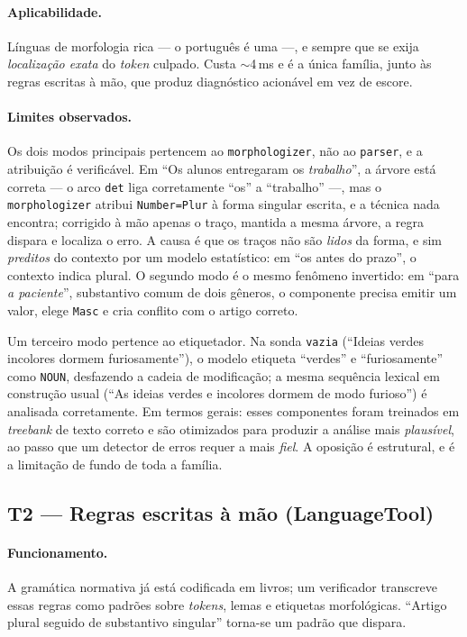 \documentclass[11pt,a4paper]{article}
\begin{document}
\paragraph{Aplicabilidade.} Línguas de morfologia rica --- o português é uma ---, e sempre que se
exija \emph{localização exata} do \textit{token} culpado. Custa $\sim$4\,ms e é a única família,
junto às regras escritas à mão, que produz diagnóstico acionável em vez de escore.

\paragraph{Limites observados.} Os dois modos principais pertencem ao \texttt{morphologizer}, não ao
\texttt{parser}, e a atribuição é verificável. Em ``Os alunos entregaram os \emph{trabalho}'', a
árvore está correta --- o arco \texttt{det} liga corretamente ``os'' a ``trabalho'' ---, mas o
\texttt{morphologizer} atribui \texttt{Number=Plur} à forma singular escrita, e a técnica nada
encontra; corrigido à mão apenas o traço, mantida a mesma árvore, a regra dispara e localiza o erro.
A causa é que os traços não são \emph{lidos} da forma, e sim \emph{preditos} do contexto por um
modelo estatístico: em ``os \underline{\hspace{1em}} antes do prazo'', o contexto indica plural. O
segundo modo é o mesmo fenômeno invertido: em ``para \emph{a paciente}'', substantivo comum de dois
gêneros, o componente precisa emitir um valor, elege \texttt{Masc} e cria conflito com o artigo
correto.

Um terceiro modo pertence ao etiquetador. Na sonda \texttt{vazia} (``Ideias verdes incolores dormem
furiosamente''), o modelo etiqueta ``verdes'' e ``furiosamente'' como \texttt{NOUN}, desfazendo a
cadeia de modificação; a mesma sequência lexical em construção usual (``As ideias verdes e
incolores dormem de modo furioso'') é analisada corretamente. Em termos gerais: esses componentes
foram treinados em \textit{treebank} de texto correto e são otimizados para produzir a análise mais
\emph{plausível}, ao passo que um detector de erros requer a mais \emph{fiel}. A oposição é
estrutural, e é a limitação de fundo de toda a família.

\subsection{T2 --- Regras escritas à mão (LanguageTool)}

\paragraph{Funcionamento.} A gramática normativa já está codificada em livros; um verificador
transcreve essas regras como padrões sobre \textit{tokens}, lemas e etiquetas morfológicas.
``Artigo plural seguido de substantivo singular'' torna-se um padrão que dispara.
\end{document}
